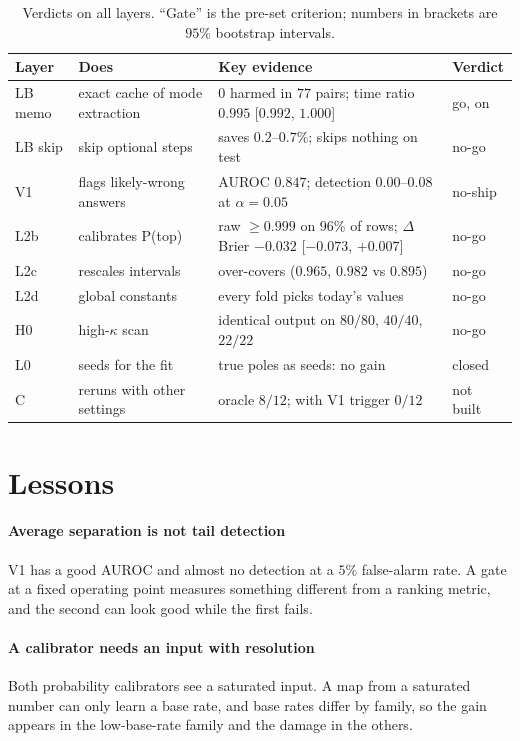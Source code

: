 \begin{table}[tbp]
\centering\small
\caption{Verdicts on all layers. ``Gate'' is the pre-set criterion; numbers in brackets are $95\%$ bootstrap intervals.}\label{tab:verdicts}
\begin{tabular}{@{}llp{5.6cm}l@{}}
\toprule
Layer & Does & Key evidence & Verdict\\
\midrule
LB memo & exact cache of mode extraction & $0$ harmed in $77$ pairs; time ratio $0.995$ [$0.992$, $1.000$] & go, on\\
LB skip & skip optional steps & saves $0.2$--$0.7\%$; skips nothing on test & no-go\\
V1 & flags likely-wrong answers & AUROC $0.847$; detection $0.00$--$0.08$ at $\alpha=0.05$ & no-ship\\
L2b & calibrates P(top) & raw $\ge0.999$ on $96\%$ of rows; $\Delta$Brier $-0.032$ [$-0.073$, $+0.007$] & no-go\\
L2c & rescales intervals & over-covers ($0.965$, $0.982$ vs $0.895$) & no-go\\
L2d & global constants & every fold picks today's values & no-go\\
H0 & high-$\kappa$ scan & identical output on $80/80$, $40/40$, $22/22$ & no-go\\
L0 & seeds for the fit & true poles as seeds: no gain & closed\\
C & reruns with other settings & oracle $8/12$; with V1 trigger $0/12$ & not built\\
\bottomrule
\end{tabular}
\end{table}



\section{Lessons}\label{sec:lessons}
\paragraph{Average separation is not tail detection} V1 has a good AUROC and almost no detection at a $5\%$ false-alarm rate. A gate at a fixed operating
point measures something different from a ranking metric, and the second can look good while the first fails.
\paragraph{A calibrator needs an input with resolution} Both probability calibrators see a saturated input. A map from a saturated number can only learn a base rate, and base rates differ by family, so the
gain appears in the low-base-rate family and the damage in the others.
